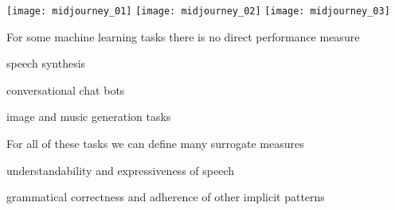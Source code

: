 \documentclass[landscape,footrule]{foils}
\begin{document}
\titlefoil


\centerline{
\texttt{[image: midjourney\_01]}\hspace*{0.5cm}
\texttt{[image: midjourney\_02]}\hspace*{0.5cm}
\texttt{[image: midjourney\_03]}\hspace*{0.5cm}
}

For some machine learning tasks there is no direct performance measure
\begin{triangles}
\item speech synthesis
\item conversational chat bots
\item image and music generation tasks
\end{triangles}
\vspace*{1cm}

For all of these tasks we can define many surrogate measures
\begin{triangles}
\item understandability and expressiveness of speech
\item grammatical correctness and adherence of other implicit patterns  
\end{triangles}   

\end{document}
